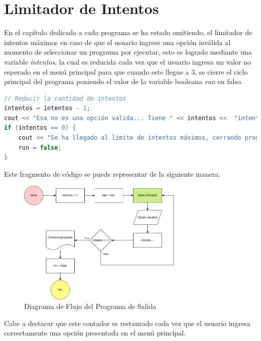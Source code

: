 \documentclass{article}
\begin{document}
\section{Limitador de Intentos}

En el capítulo dedicado a cada programa se ha estado omitiendo, el limitador de intentos máximos en caso de que el usuario ingrese una opción inválida al momento de seleccionar un programa por ejecutar, esto es logrado mediante una variable \emph{intentos}, la cual es reducida cada vez que el usuario ingresa un valor no esperado en el menú principal para que cuando este llegue a 3, se cierre el ciclo principal del programa poniendo el valor de la variable booleana \emph{run} en falso.

\begin{lstlisting}[style=mystyle, language=c++]
// Reducir la cantidad de intentos
intentos = intentos - 1;
cout << "Esa no es una opción valida... Tiene " << intentos <<  "intentos restantes..." << endl; 
if (intentos == 0) {
    cout << "Se ha llegado al limite de intentos máximos, cerrando programa.." << endl;
    run = false;
}
\end{lstlisting}

Este fragmento de código se puede representar de la siguiente manera.

\begin{figure}[H]
    \centering
    \includegraphics[width=8cm]{limitador_intentos_salida}
    \caption{Diagrama de Flujo del Programa de Salida}
\end{figure}

Cabe a destacar que este contador es restaurado cada vez que el usuario ingresa correctamente una opción presentada en el menú principal.
\end{document}
